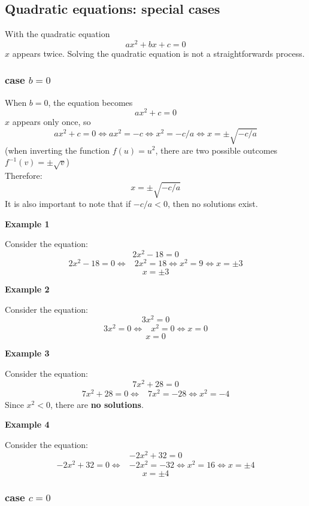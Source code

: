 \documentclass{article}
\begin{document}
\subsection*{Quadratic equations: special cases}

With the quadratic equation 
\[ax^2 + bx + c = 0\]
\(x\) appears twice. Solving the quadratic equation is not a straightforwards process.

\vspace{5mm}

\subsubsection*{case \(b = 0\)}

When \(b = 0\), the equation becomes
\[ax^2 + c = 0\]
\(x\) appears only once, so 
\[ax^2 + c = 0 \iff ax^2 = -c \iff x^2 = -c/a \iff x = \pm\sqrt{-c/a}\]
(when inverting the function \(f(u) = u^2\), there are two possible outcomes \(f^{-1}(v) = \pm\sqrt{v}\)) \\
Therefore:
\[x = \pm\sqrt{-c/a}\]
It is also important to note that if \(-c/a < 0\), then no solutions exist.

\textbf{Example 1}

Consider the equation:
\[2x^2 - 18 = 0\]
\begin{align*}
2x^2 - 18 = 0 
\iff & 2x^2 = 18 
\iff x^2 = 9 
\iff x = \pm 3
\end{align*}
\[x = \pm 3\]

\textbf{Example 2}

Consider the equation:
\[3x^2 = 0\]
\begin{align*}
3x^2 = 0 
\iff & x^2 = 0 
\iff x = 0 
\end{align*}
\[x = 0\]

\textbf{Example 3}

Consider the equation:
\[7x^2 + 28 = 0\]
\begin{align*}
7x^2 + 28 = 0 
\iff & 7x^2 = -28 
\iff x^2 = -4
\end{align*}
Since \(x^2 < 0\), there are {\bf no solutions}.

\textbf{Example 4}

Consider the equation:
\[-2x^2 + 32 = 0\]
\begin{align*}
-2x^2 + 32 = 0 
\iff & -2x^2 = -32 
\iff x^2 = 16
\iff x = \pm 4
\end{align*}
\[x = \pm 4\]



\subsubsection*{case \(c = 0\)}
\end{document}
